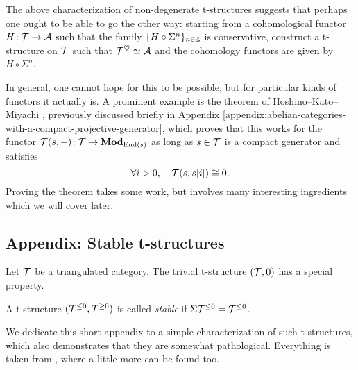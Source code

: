 \begin{remark}
	The above characterization of non-degenerate t-structures suggests that perhaps one ought to be able to go the other way: starting from a cohomological functor \(H\!:\mathcal{T}\to\mathcal{A}\)
	such that the family \(\{H\circ\Sigma^n\}_{n\in\mathbb{Z}}\) is conservative, construct a t-structure on \(\mathcal{T}\) such that \(\mathcal{T}^\heartsuit\simeq\mathcal{A}\) and the cohomology functors
	are given by \(H\circ\Sigma^n\).

	In general, one cannot hope for this to be possible, but for particular kinds of functors it actually is. A prominent example is the theorem
	of Hoshino--Kato--Miyachi \cite{hkm02}, previously discussed briefly in Appendix \ref{appendix:abelian-categories-with-a-compact-projective-generator}, which proves that
	this works for the functor \(\mathcal{T}(s,-)\!:\mathcal{T}\to\mathbf{Mod}_{\operatorname{End}(s)}\) as long as \(s\in\mathcal{T}\) is a compact generator and satisfies
	\[ \forall i > 0,\quad \mathcal{T}(s,s[i]) \cong 0. \]
	Proving the theorem takes some work, but involves many interesting ingredients which we will cover later.
\end{remark}

\subsection{Appendix: Stable t-structures}
Let \(\mathcal{T}\) be a triangulated category. The trivial t-structure \((\mathcal{T},0)\) has a special property.
\begin{definition}
	A t-structure \((\mathcal{T}^{\leq 0},\mathcal{T}^{\geq 0})\) is called \emph{stable} if \(\Sigma\mathcal{T}^{\leq 0} = \mathcal{T}^{\leq 0}\).
\end{definition}
We dedicate this short appendix to a simple characterization of such t-structures, which also demonstrates that they are somewhat pathological. Everything is taken
from \cite{chen2022extensionststructures}, where a little more can be found too.

